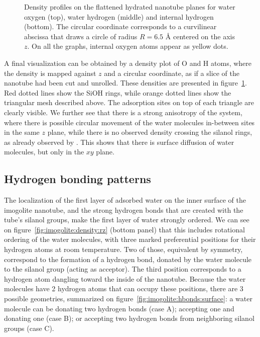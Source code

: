 \documentclass[thesis]{subfiles}
\begin{document}
\begin{figure}[ht]
    \centering
    
    \caption{Density profiles on the flattened hydrated nanotube planes for
    water oxygen (top), water hydrogen (middle) and internal hydrogen (bottom).
    The circular coordinate corresponds to a curvilinear abscissa that draws a
    circle of radius $R = 6.5$ {\AA} centered on the axis $z$. On all the
    graphs, internal oxygen atoms appear as yellow dots.}
    \label{fig:imogolite:density:circular}
\end{figure}

A final visualization can be obtained by a density plot of O and H atoms, where
the density is mapped against $z$ and a circular coordinate, as if a slice of
the nanotube had been cut and unrolled. These densities are presented in
figure~\ref{fig:imogolite:density:circular}. Red dotted lines show the SiOH
rings, while orange dotted lines show the triangular mesh described above. The
adsorption sites on top of each triangle are clearly visible. We further see
that there is a strong anisotropy of the system, where there is possible
circular movement of the water molecules in-between sites in the same $z$ plane,
while there is no observed density crossing the silanol rings, as already
observed by \citeauthor{Creton2008}\cite{Creton2008}. This shows that there is
surface diffusion of water molecules, but only in the $xy$ plane.

\subsection{Hydrogen bonding patterns}

The localization of the first layer of adsorbed water on the inner surface of
the imogolite nanotube, and the strong hydrogen bonds that are created with the
tube's silanol groups, make the first layer of water strongly ordered. We can
see on figure~\ref{fig:imogolite:density:rz} (bottom panel) that this includes
rotational ordering of the water molecules, with three marked preferential
positions for their hydrogen atoms at room temperature. Two of those, equivalent
by symmetry, correspond to the formation of a hydrogen bond, donated by the
water molecule to the silanol group (acting as acceptor). The third position
corresponds to a hydrogen atom dangling toward the inside of the nanotube.
Because the water molecules have 2 hydrogen atoms that can occupy these
positions, there are 3 possible geometries, summarized on
figure~\ref{fig:imogolite:hbonds:surface}: a water molecule can be donating two
hydrogen bonds (case A); accepting one and donating one (case B); or accepting
two hydrogen bonds from neighboring silanol groups (case C).
\end{document}

